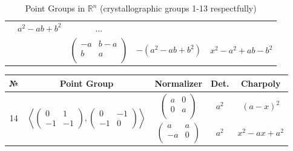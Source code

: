 \documentclass[a4paper,12pt]{amsart}
\begin{document}
\begin{table}[h]
\begin{tabular}{|c|c|c|c|c|}
			& $a^2 - ab + b^2$ & $\dots$  \\
			
			
			& & $\begin{pmatrix}
				-a & b-a \\        
				b & a \\
			\end{pmatrix}$
			& $-(a^2 - ab + b^2)$ & $x^2 - a^2 + ab - b^2$  \\
		
			\hline
		\end{tabular}
		
		\caption{Point Groups in $\mathbb{R}^n$ (crystallographic groups 1-13 respectfully)}	
		\label{tab:normalizers}		
	\end{table}
	
	\newpage
	\begin{table}[h]
		\begin{tabular}{|c|c|c|c|c|}
			\hline
			
			
			№ & \textbf{Point Group} &  \textbf{Normalizer} & \textbf{Det.} & \textbf{Charpoly} \\

			\hline
			
			\multirow{6}{*}{14} 
			& \multirow{8}{*}{
				$\left\langle 
				\begin{pmatrix}
					0 & 1 \\ 
					-1 & -1 
				\end{pmatrix}, 
				\begin{pmatrix}
					0 & -1 \\ 
					-1 & 0 
				\end{pmatrix}
				\right\rangle$	
			}
			& $\begin{pmatrix}
				a & 0 \\        
				0 & a \\
			\end{pmatrix}$
			
			&  $a^2$   &       $(a - x)^2$     \\
			
			& &  $\begin{pmatrix}
				a & a \\        
				-a & 0 \\
			\end{pmatrix}$
			
			&   $a^2$     &       $ x^2 - ax + a^2$                       \\
			

\end{tabular}
\end{table}
\end{document}
